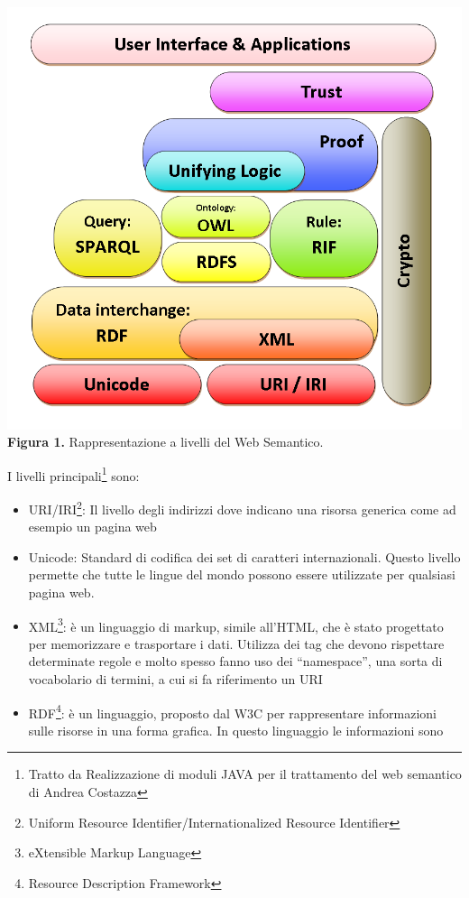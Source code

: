 \documentclass[a4paper,11pt]{article}
\begin{document}
\begin{enumerate}
\begin{enumerate}[label*=\arabic*.]
			\begin{center}
				\includegraphics[scale=0.5]{semweb-layers.png}\newline
				\textbf{Figura 1.} Rappresentazione a livelli del Web Semantico.
			\end{center}	
I livelli principali\footnote{Tratto da Realizzazione di moduli JAVA per il trattamento del web semantico di Andrea Costazza} sono:
			\begin{itemize}	
				\item URI/IRI\footnote{Uniform Resource Identifier/Internationalized Resource Identifier}: Il livello degli indirizzi dove indicano una risorsa generica come ad esempio un pagina web
				\item Unicode: Standard di codifica dei set di caratteri internazionali. Questo livello permette che tutte le lingue del mondo possono essere utilizzate per qualsiasi pagina web.
				\item XML\footnote{eXtensible Markup Language}: è un linguaggio di markup, simile all'HTML, che è stato progettato per memorizzare e trasportare i dati. Utilizza dei tag che devono rispettare determinate regole e molto spesso fanno uso dei “namespace”, una sorta di vocabolario di termini, a cui si fa riferimento un URI				
				\item RDF\footnote{Resource Description Framework}: è un linguaggio, proposto dal W3C per rappresentare informazioni sulle risorse in una forma grafica. In questo linguaggio le informazioni sono

\end{itemize}
\end{enumerate}
\end{enumerate}
\end{document}
